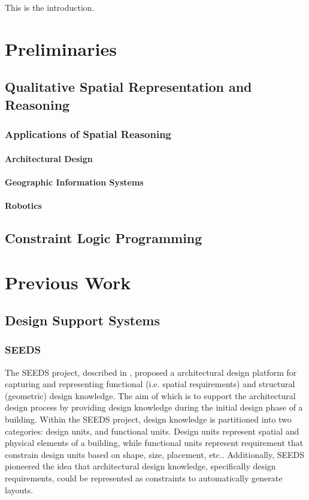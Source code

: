 \documentclass[12pt]{ucthesis}
\begin{document}
This is the introduction.



\chapter{Preliminaries}
\label{preliminaries}

\section{Qualitative Spatial Representation and Reasoning}
\subsection{Applications of Spatial Reasoning}
\subsubsection{Architectural Design}
\subsubsection{Geographic Information Systems}
\subsubsection{Robotics}
\section{Constraint Logic Programming}


\chapter{Previous Work}
\label{previous-work}
\section{Design Support Systems}
\subsection{SEEDS}
The SEEDS project, described in \cite{FlemmingIKM94}, proposed a architectural design platform for capturing and representing functional (i.e. spatial requirements) and structural (geometric) design knowledge. The aim of which is to support the architectural design process by providing design knowledge during the initial design phase of a building. Within the SEEDS project, design knowledge is partitioned into two categories: design units, and functional units. Design units represent spatial and physical elements of a building, while functional units represent requirement that constrain design units
based on shape, size, placement, etc.. Additionally, SEEDS pioneered the idea that architectural design knowledge, specifically design requirements, could be represented as constraints to automatically generate layouts.
\end{document}
